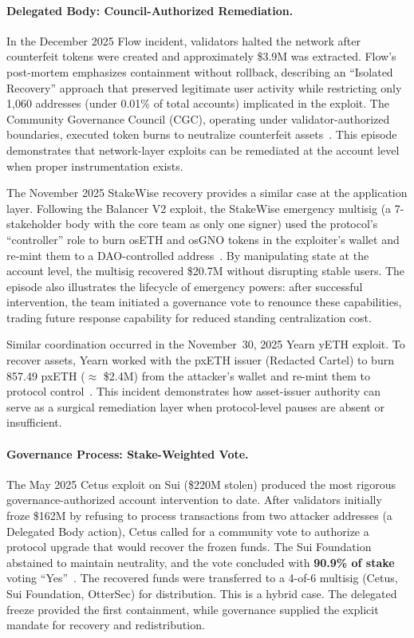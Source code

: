\documentclass[12pt]{article}
\begin{document}
\paragraph{Delegated Body: Council-Authorized Remediation.}
In the December 2025 Flow incident, validators halted the network after counterfeit tokens were created and approximately \$3.9M was extracted. Flow's post-mortem emphasizes containment without rollback, describing an ``Isolated Recovery'' approach that preserved legitimate user activity while restricting only 1,060 addresses (under 0.01\% of total accounts) implicated in the exploit. The Community Governance Council (CGC), operating under validator-authorized boundaries, executed token burns to neutralize counterfeit assets~\cite{FlowPostmortem2026,Flow2025Recovery}. This episode demonstrates that network-layer exploits can be remediated at the account level when proper instrumentation exists.

The November 2025 StakeWise recovery provides a similar case at the application layer. Following the Balancer V2 exploit, the StakeWise emergency multisig (a 7-stakeholder body with the core team as only one signer) used the protocol's ``controller'' role to burn osETH and osGNO tokens in the exploiter's wallet and re-mint them to a DAO-controlled address~\cite{StakeWise2025Recovery}. By manipulating state at the account level, the multisig recovered \$20.7M without disrupting stable users. The episode also illustrates the lifecycle of emergency powers: after successful intervention, the team initiated a governance vote to renounce these capabilities, trading future response capability for reduced standing centralization cost.

Similar coordination occurred in the November~30, 2025 Yearn yETH exploit. To recover assets, Yearn worked with the pxETH issuer (Redacted Cartel) to burn 857.49 pxETH ($\approx$ \$2.4M) from the attacker's wallet and re-mint them to protocol control~\cite{Yearn2025Recovery}. This incident demonstrates how asset-issuer authority can serve as a surgical remediation layer when protocol-level pauses are absent or insufficient.


\paragraph{Governance Process: Stake-Weighted Vote.}
The May 2025 Cetus exploit on Sui (\$220M stolen) produced the most rigorous governance-authorized account intervention to date. After validators initially froze \$162M by refusing to process transactions from two attacker addresses (a Delegated Body action), Cetus called for a community vote to authorize a protocol upgrade that would recover the frozen funds. The Sui Foundation abstained to maintain neutrality, and the vote concluded with \textbf{90.9\% of stake} voting ``Yes''~\cite{SuiCetusVote,UnchainedCetus2025}. The recovered funds were transferred to a 4-of-6 multisig (Cetus, Sui Foundation, OtterSec) for distribution. This is a hybrid case. The delegated freeze provided the first containment, while governance supplied the explicit mandate for recovery and redistribution.
\end{document}
